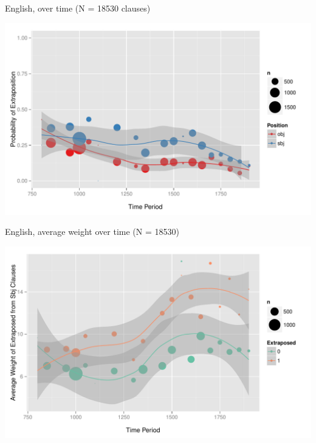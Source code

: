 \documentclass[hyperref={pdfpagelabels=false}]{beamer}
\begin{document}
\begin{frame}{English, over time (N = 18530 clauses)}

\begin{center}
\includegraphics[width=1.1\textwidth]{exSbjObjYearBinned50Loessymeb.pdf}
\end{center}
\end{frame}


\begin{frame}{English, average weight over time (N = 18530)}

\begin{center}
\includegraphics[width=1.1\textwidth]{exWeightYearBinned50Loessymeb.pdf}
\end{center}
\end{frame}
\end{document}
